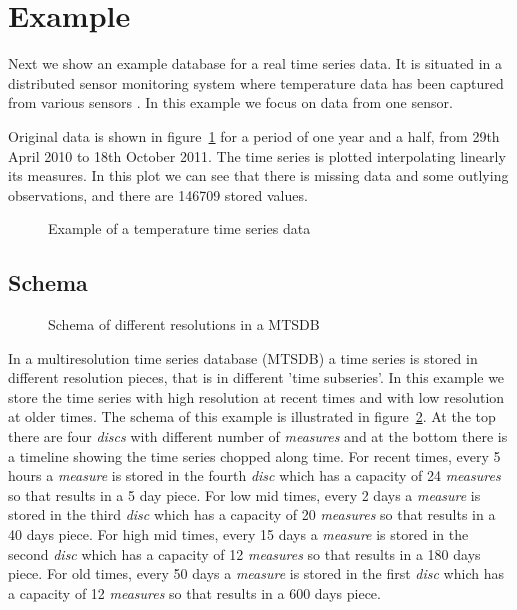 \section{Example}
\label{sec:example}

Next we show an example database for a real time series data.  It is
situated in a distributed sensor monitoring system where temperature
data has been captured from various sensors \cite{alippi10}. In this
example we focus on data from one sensor. 

Original data is shown in figure~\ref{fig:exemple:original} for a
period of one year and a half, from 29th April 2010 to 18th October
2011.  The time series is plotted interpolating linearly its measures.
In this plot we can see that there is missing data and some outlying
observations, and there are 146709 stored values.


\begin{figure}[tp]
  \centering
  
  \caption{Example of a temperature time series data}
  \label{fig:exemple:original}
\end{figure}



\subsection{Schema}

\begin{figure}[tp]
\centering

\caption{Schema of different resolutions in a MTSDB}
\label{fig:exemple:window}
\end{figure}


In a multiresolution time series database (MTSDB) a time series is
stored in different resolution pieces, that is in different 'time
subseries'.  In this example we store the time series with high
resolution at recent times and with low resolution at older times. The
schema of this example is illustrated in
figure~\ref{fig:exemple:window}. At the top there are four
\emph{discs} with different number of \emph{measures} and at the
bottom there is a timeline showing the time series chopped along
time. For recent times, every 5 hours a \emph{measure} is stored in
the fourth \emph{disc} which has a capacity of 24 \emph{measures} so
that results in a 5 day piece. For low mid times, every 2 days a
\emph{measure} is stored in the third \emph{disc} which has a capacity
of 20 \emph{measures} so that results in a 40 days piece. For high mid
times, every 15 days a \emph{measure} is stored in the second
\emph{disc} which has a capacity of 12 \emph{measures} so that results
in a 180 days piece. For old times, every 50 days a \emph{measure} is
stored in the first \emph{disc} which has a capacity of 12
\emph{measures} so that results in a 600 days piece.



